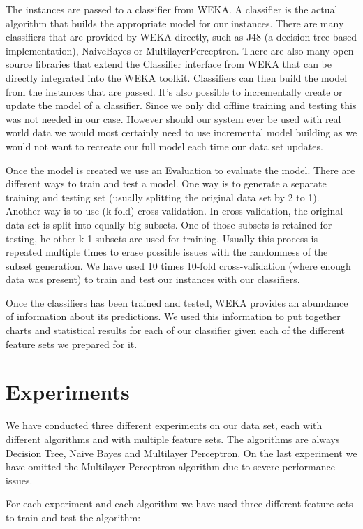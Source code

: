 The instances are passed to a classifier from WEKA. A classifier is the actual algorithm that builds the appropriate model for our instances. There are many classifiers that are provided by WEKA directly, such as J48 (a decision-tree based implementation), NaiveBayes or MultilayerPerceptron. There are also many open source libraries that extend the Classifier interface from WEKA that can be directly integrated into the WEKA toolkit. Classifiers can then build the model from the instances that are passed. It's also possible to incrementally create or update the model of a classifier. Since we only did offline training and testing this was not needed in our case. However should our system ever be used with real world data we would most certainly need to use incremental model building as we would not want to recreate our full model each time our data set updates.

Once the model is created we use an Evaluation to evaluate the model. There are different ways to train and test a model. One way is to generate a separate training and testing set (usually splitting the original data set by 2 to 1). Another way is to use (k-fold) cross-validation. In cross validation, the original data set is split into equally big subsets. One of those subsets is retained for testing, he other k-1 subsets are used for training. Usually this process is repeated multiple times to erase possible issues with the randomness of the subset generation. We have used 10 times 10-fold cross-validation (where enough data was present) to train and test our instances with our classifiers.

Once the classifiers has been trained and tested, WEKA provides an abundance of information about its predictions. We used this information to put together charts and statistical results for each of our classifier given each of the different feature sets we prepared for it.

\section{Experiments}
We have conducted three different experiments on our data set, each with different algorithms and with multiple feature sets. The algorithms are always Decision Tree, Naive Bayes and Multilayer Perceptron. On the last experiment we have omitted the Multilayer Perceptron algorithm due to severe performance issues.

For each experiment and each algorithm we have used three different feature sets to train and test the algorithm:

